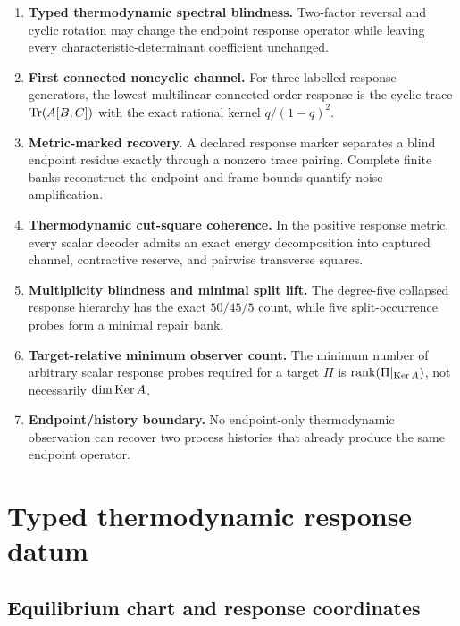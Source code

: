 \begin{enumerate}[label=\textbf{T\arabic*.},leftmargin=2.2em]
\item \textbf{Typed thermodynamic spectral blindness.} Two-factor reversal and cyclic rotation may change the endpoint response operator while leaving every characteristic-determinant coefficient unchanged.
\item \textbf{First connected noncyclic channel.} For three labelled response generators, the lowest multilinear connected order response is the cyclic trace $\operatorname{Tr}(A[B,C])$ with the exact rational kernel $q/(1-q)^2$.
\item \textbf{Metric-marked recovery.} A declared response marker separates a blind endpoint residue exactly through a nonzero trace pairing. Complete finite banks reconstruct the endpoint and frame bounds quantify noise amplification.
\item \textbf{Thermodynamic cut-square coherence.} In the positive response metric, every scalar decoder admits an exact energy decomposition into captured channel, contractive reserve, and pairwise transverse squares.
\item \textbf{Multiplicity blindness and minimal split lift.} The degree-five collapsed response hierarchy has the exact $50/45/5$ count, while five split-occurrence probes form a minimal repair bank.
\item \textbf{Target-relative minimum observer count.} The minimum number of arbitrary scalar response probes required for a target $\Pi$ is $\operatorname{rank}(\Pi|_{\operatorname{Ker} A})$, not necessarily $\dim\operatorname{Ker} A$.
\item \textbf{Endpoint/history boundary.} No endpoint-only thermodynamic observation can recover two process histories that already produce the same endpoint operator.
\end{enumerate}

\section{Typed thermodynamic response datum}

\subsection{Equilibrium chart and response coordinates}

